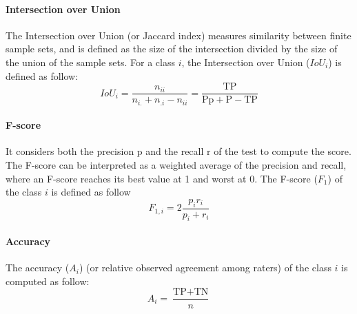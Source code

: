 \paragraph{Intersection over Union \\}
The Intersection over Union (or Jaccard index) \citep{jaccard1912distribution} measures similarity between finite sample sets, and is defined as the size of the intersection divided by the size of the union of the sample sets. For a class $i$, the Intersection over Union ($IoU_{i}$) is defined as follow:
\begin{equation}
IoU_{i}=\frac{n_{ii}}{n_{i.}+n_{.i}-n_{ii}}=\frac{\text{TP}}{\text{Pp}+\text{P}-\text{TP}}
\end{equation}

\paragraph{F-score \\}
It considers both the precision p and the recall r of the test to compute the score. The F-score can be interpreted as a weighted average of the precision and recall, where an F-score reaches its best value at 1 and worst at 0. The F-score ($F_{1}$) of the class $i$ is defined as follow
\begin{equation}
F_{1,i}=2\frac{p_{i}r_{i}}{p_{i}+r_{i}}
\end{equation}

\paragraph{Accuracy \\}
The accuracy ($A_{i}$) (or relative observed agreement among raters) of the class $i$ is computed as follow:
\begin{equation}
A_{i}=\frac{\text{TP}+\text{TN}}{n}
\end{equation}

